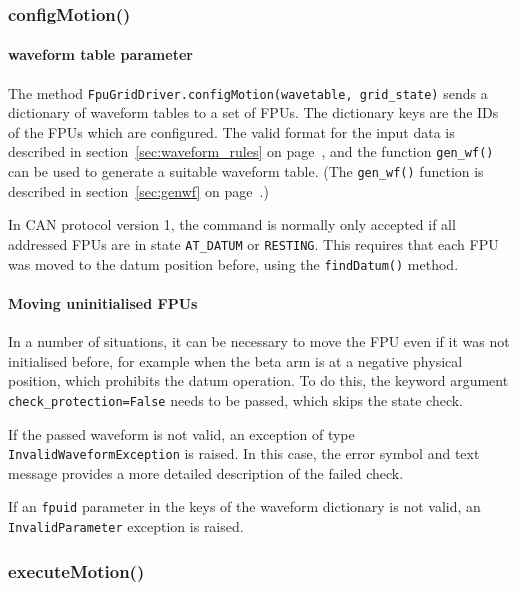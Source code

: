 \documentclass[11pt,a4paper]{report}
\begin{document}
\subsubsection{configMotion()}
\paragraph{waveform table parameter}
The method \texttt{FpuGridDriver.configMotion(wavetable, grid\_state)}
sends a dictionary of waveform tables to a set of FPUs. The dictionary
keys are the IDs of the FPUs which are configured. The valid format
for the input data is described in section~\ref{sec:waveform_rules} on
page~\pageref{sec:waveform_rules}, and the function \texttt{gen\_wf()}
can be used to generate a suitable waveform table. (The
\texttt{gen\_wf()} function is described in section~\ref{sec:genwf} on
page~\pageref{sec:genwf}.)

In CAN protocol version 1, the command is normally only accepted if
all addressed FPUs are in state \texttt{AT\_DATUM} or \texttt{RESTING}.
This requires that each FPU was moved to the datum position before, using
the \texttt{findDatum()} method.

\paragraph{Moving uninitialised FPUs}
In a number of situations, it can be necessary to move the FPU even if
it was not initialised before, for example when the beta arm is at a
negative physical position, which prohibits the datum operation. To do
this, the keyword argument \texttt{check\_protection=False} needs to be
passed, which skips the state check.


If the passed waveform is not valid, an exception of type
\texttt{InvalidWaveformException} is raised. In this case, the error
symbol and text message provides a more detailed description of the
failed check. 

If an \texttt{fpuid} parameter in the keys of the waveform dictionary
is not valid, an \texttt{InvalidParameter} exception is raised.

\subsubsection{executeMotion()}
\end{document}
